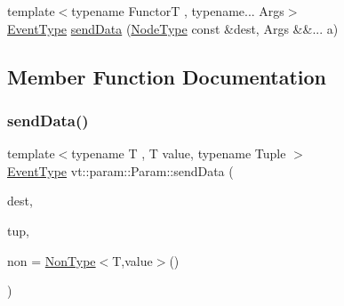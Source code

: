 \begin{DoxyCompactItemize}
\item 
{\footnotesize template$<$typename FunctorT , typename... Args$>$ }\\\hyperlink{namespacevt_a009267401def7ae8bf201892222d060f}{Event\+Type} \hyperlink{structvt_1_1param_1_1_param_aba248d94d04ed2d6247af406685cdb36}{send\+Data} (\hyperlink{namespacevt_a866da9d0efc19c0a1ce79e9e492f47e2}{Node\+Type} const \&dest, Args \&\&... a)
\end{DoxyCompactItemize}


\subsection{Member Function Documentation}
\mbox{\label{structvt_1_1param_1_1_param_aea67124175d1d028b36f4d3e38b4dd48}} 
\subsubsection{\texorpdfstring{send\+Data()}{sendData()}\hspace{0.1cm}{\footnotesize\ttfamily [1/7]}}
{\footnotesize\ttfamily template$<$typename T , T value, typename Tuple $>$ \\
\hyperlink{namespacevt_a009267401def7ae8bf201892222d060f}{Event\+Type} vt\+::param\+::\+Param\+::send\+Data (\begin{DoxyParamCaption}\item[{\hyperlink{namespacevt_a866da9d0efc19c0a1ce79e9e492f47e2}{Node\+Type} const \&}]{dest,  }\item[{Tuple}]{tup,  }\item[{\hyperlink{structvt_1_1param_1_1_non_type}{Non\+Type}$<$ T, value $>$ \+\_\+\+\_\+attribute\+\_\+\+\_\+((unused))}]{non = {\ttfamily \hyperlink{structvt_1_1param_1_1_non_type}{Non\+Type}$<$T,value$>$()} }\end{DoxyParamCaption})\hspace{0.3cm}{\ttfamily [inline]}}

\mbox{\label{structvt_1_1param_1_1_param_a40cf6112cd6f7a4167680e8fa5c1eb1e}} 

